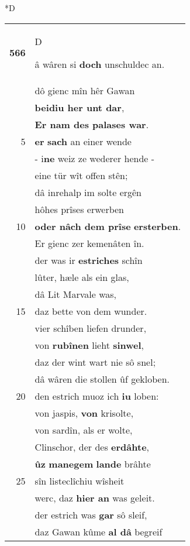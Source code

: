 \documentclass[8pt,a4paper,notitlepage]{article}
\begin{document}
\begin{table}[ht]
\begin{minipage}[t]{0.5\linewidth}
\small
\begin{center}*D
\end{center}
\begin{tabular}{rl}
\textbf{566} & \begin{large}D\end{large}â wâren si \textbf{doch} unschuldec an.\\ 
 & dô gienc mîn hêr Gawan\\ 
 & \textbf{beidiu her unt dar},\\ 
 & \textbf{Er nam des palases war}.\\ 
5 & \textbf{er} \textbf{sach} an einer wende\\ 
 & - i\textbf{ne} weiz ze wederer hende -\\ 
 & eine tür wît offen stên;\\ 
 & dâ inrehalp im solte ergên\\ 
 & hôhes prîses erwerben\\ 
10 & \textbf{oder nâch dem prîse} \textbf{ersterben}.\\ 
 & Er gienc zer kemenâten în.\\ 
 & der was ir \textbf{estriches} schîn\\ 
 & lûter, hæle als ein glas,\\ 
 & dâ Lit Marvale was,\\ 
15 & daz bette von dem wunder.\\ 
 & vier schîben liefen drunder,\\ 
 & von \textbf{rubînen} lieht \textbf{sinwel},\\ 
 & daz der wint wart nie sô snel;\\ 
 & dâ wâren die stollen ûf gekloben.\\ 
20 & den estrich muoz ich \textbf{iu} loben:\\ 
 & von jaspis, \textbf{von} krisolte,\\ 
 & von sardîn, als er wolte,\\ 
 & Clinschor, der des \textbf{erdâhte},\\ 
 & \textbf{ûz} \textbf{manegem} \textbf{lande} brâhte\\ 
25 & sîn listeclîchiu wîsheit\\ 
 & werc, daz \textbf{hier an} was geleit.\\ 
 & der estrich was \textbf{gar} sô sleif,\\ 
 & daz Gawan kûme \textbf{al dâ} begreif\\ 

\end{tabular}
\end{minipage}
\end{table}
\end{document}
